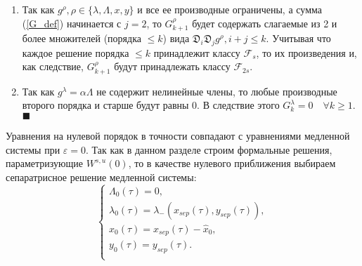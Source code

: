 \begin{enumerate}
\item Так как $g^\rho, \rho \in \{\lambda, \Lambda, x, y\}$ и все ее производные ограничены, а сумма (\ref{G_def}) начинается с $j=2$, то $G_{k+1}^\rho$ будет содержать слагаемые из 2 и более множителей (порядка $\le k$) вида $\mathfrak{D}_i \mathfrak{D}_j g^\rho, i+j \leq k$. Учитывая что каждое решение порядка $\le k$ принадлежит классу $\mathcal{F}_s$, то их произведения и, как следствие, $G_{k+1}^\rho$ будут принадлежать классу $\mathcal{F}_{2s}$.

\item Так как $g^\lambda = \alpha \Lambda$ не содержит нелинейные члены, то любые производные второго порядка и старше будут равны 0. В следствие этого $G_k^\lambda = 0 \quad \forall k \ge 1$. $\blacksquare$
\end{enumerate}
Уравнения на нулевой порядок в точности совпадают с уравнениями медленной системы при $\varepsilon = 0$. Так как в данном разделе строим формальные решения, параметризующие $W^{s,u}(0)$, то в качестве нулевого приближения выбираем сепаратрисное решение медленной системы:
\begin{equation*}
    \begin{cases}
        \Lambda_0(\tau) = 0 , \\
        
        \lambda_0(\tau) = \lambda_- (x_{sep}(\tau),y_{sep}(\tau)), \\
        
        x_0(\tau) = x_{sep}(\tau) - \hat x_0, \\
        
        y_0(\tau) = y_{sep}(\tau).\\
    \end{cases}
\end{equation*}
